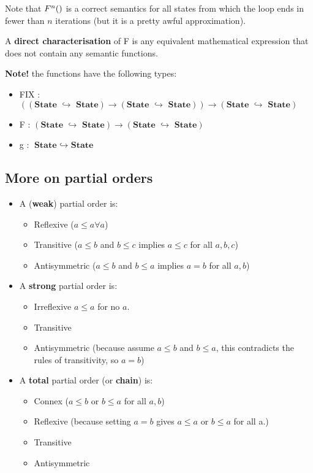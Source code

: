 \documentclass[11pt,a4paper,headsepline,titlepage,dvipsnames,cmyk]{scrartcl}
\newcommand\pfun{\hookrightarrow}
\begin{document}
Note that $F^n(\empty)$ is a correct semantics for all states from which
the loop ends in fewer than $n$ iterations (but it is a pretty awful
approximation).

A \textbf{direct characterisation} of F is any equivalent mathematical
expression that does not contain any semantic functions.

\newpage
\textbf{Note!} the functions have the following types:
\begin{itemize}
    \item FIX : $(( \textbf{State } \pfun \textbf{ State} ) \rightarrow (
        \textbf{State } \pfun \textbf{ State} ))\rightarrow (
        \textbf{State } \pfun \textbf{ State} )$
    \item F : $(\textbf{State } \pfun \textbf{ State} ) \rightarrow (
        \textbf{State } \pfun \textbf{ State} )$
    \item g : $ \textbf{State } \pfun \textbf{ State}$
\end{itemize}

\subsection{More on partial orders}%
\label{sub:partial-order-2}
\begin{itemize}
    \item A (\textbf{weak}) partial order is:
        \begin{itemize}
            \item Reflexive ($a \le a \forall a$)
            \item Transitive ($a \le b$ and $b \le c$ implies $a \le c$
                for all $a,b,c$)
            \item Antisymmetric ($a \le b$ and $b \le a$ implies $a = b$
                for all $a,b$)
        \end{itemize}
    \item  A \textbf{strong} partial order is:
        \begin{itemize}
            \item Irreflexive $a \le a$ for no $a$.
            \item Transitive
            \item Antisymmetric (because assume $a \le b$ and $b \le a$,
                this contradicts the rules of transitivity, so $a = b$)
        \end{itemize}
    \item A \textbf{total} partial order (or \textbf{chain}) is:
        \begin{itemize}
            \item Connex ($a \le b$ or $b \le a$ for all $a, b$)
            \item Reflexive (because setting $a = b$ gives $a \le a$ or $b
                \le a$ for all a.)
            \item Transitive
            \item Antisymmetric
        \end{itemize}
\end{itemize}
\end{document}

